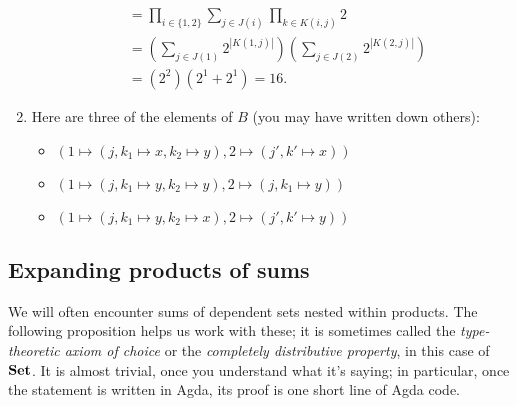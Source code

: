 \documentclass[Book-Poly]{subfiles}
\begin{document}
\begin{exercise}
\begin{solution}
\begin{enumerate}
\begin{align*}
	    &= \prod_{i\in \{1,2\}}\sum_{j\in J(i)}\prod_{k\in K(i,j)}2 \\
	    &= \left(\sum_{j\in J(1)} 2^{|K(1,j)|}\right)\left(\sum_{j\in J(2)} 2^{|K(2,j)|}\right) \\
	    &= \left(2^2\right)\left(2^1 + 2^1\right) = 16.
	\end{align*}
	\item Here are three of the elements of $B$ (you may have written down others):
	\begin{itemize}
	    \item $(1 \mapsto (j, k_1 \mapsto x, k_2 \mapsto y), 2 \mapsto (j', k' \mapsto x))$
	    \item $(1 \mapsto (j, k_1 \mapsto y, k_2 \mapsto y), 2 \mapsto (j, k_1 \mapsto y))$
	    \item $(1 \mapsto (j, k_1 \mapsto y, k_2 \mapsto x), 2 \mapsto (j', k' \mapsto y))$
	\end{itemize}
\qedhere
\end{enumerate}
\end{solution}
\end{exercise}

\subsection{Expanding products of sums} \label{subsec.poly.func_nat.repr_sum.expand}

We will often encounter sums of dependent sets nested within products.
The following proposition helps us work with these; it is sometimes called the \emph{type-theoretic axiom of choice} or the \emph{completely distributive property}, in this case of $\mathbf{Set}$. It is almost trivial, once you understand what it's saying; in particular, once the statement is written in Agda, its proof is one short line of Agda code. 
\end{document}
